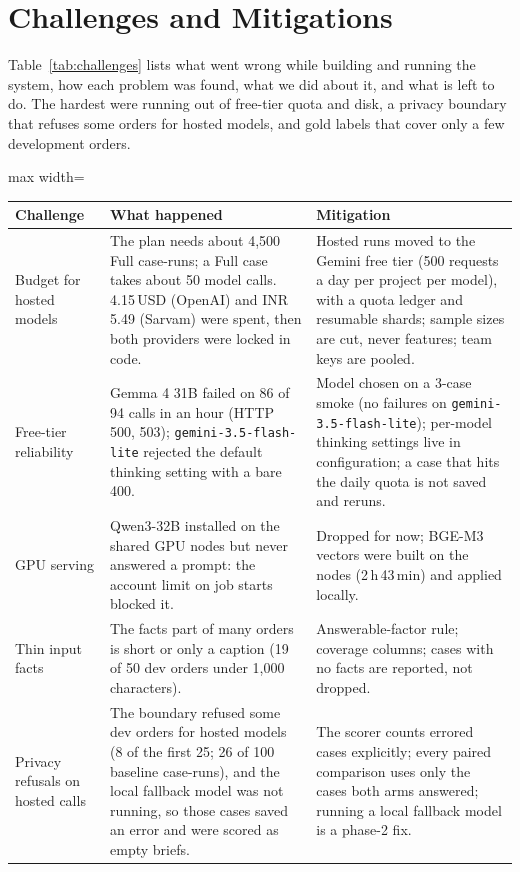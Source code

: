 \section{Challenges and Mitigations}
\label{sec:challenges}

Table~\ref{tab:challenges} lists what went wrong while building and running the system, how each problem was found, what we did about it, and what is left to do. The hardest were running out of free-tier quota and disk, a privacy boundary that refuses some orders for hosted models, and gold labels that cover only a few development orders.

\begin{table}[!t]
\centering\small
\begin{adjustbox}{max width=\textwidth}
\begin{tabular}{@{}p{4.6cm}p{5.4cm}p{5.2cm}@{}}
\toprule
Challenge & What happened & Mitigation \\
\midrule
Budget for hosted models & The plan needs about 4,500 Full case-runs; a Full case takes about 50 model calls. 4.15\,USD (OpenAI) and INR 5.49 (Sarvam) were spent, then both providers were locked in code. & Hosted runs moved to the Gemini free tier (500 requests a day per project per model), with a quota ledger and resumable shards; sample sizes are cut, never features; team keys are pooled. \\
Free-tier reliability & Gemma 4 31B failed on 86 of 94 calls in an hour (HTTP 500, 503); \texttt{gemini-3.5-flash-lite} rejected the default thinking setting with a bare 400. & Model chosen on a 3-case smoke (no failures on \texttt{gemini-3.5-flash-lite}); per-model thinking settings live in configuration; a case that hits the daily quota is not saved and reruns. \\
GPU serving & Qwen3-32B installed on the shared GPU nodes but never answered a prompt: the account limit on job starts blocked it. & Dropped for now; BGE-M3 vectors were built on the nodes (2\,h\,43\,min) and applied locally. \\
Thin input facts & The facts part of many orders is short or only a caption (19 of 50 dev orders under 1,000 characters). & Answerable-factor rule; coverage columns; cases with no facts are reported, not dropped. \\
Privacy refusals on hosted calls & The boundary refused some dev orders for hosted models (8 of the first 25; 26 of 100 baseline case-runs), and the local fallback model was not running, so those cases saved an error and were scored as empty briefs. & The scorer counts errored cases explicitly; every paired comparison uses only the cases both arms answered; running a local fallback model is a phase-2 fix. \\

\end{tabular}
\end{adjustbox}
\end{table}
